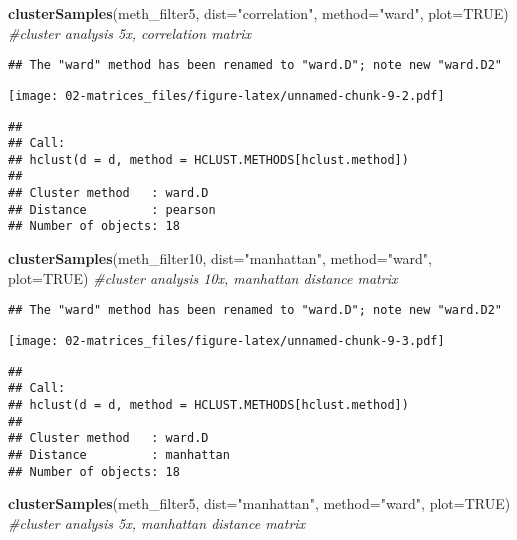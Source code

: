 \documentclass[]{article}
\newenvironment{Shaded}{\begin{snugshade}}{\end{snugshade}}
\newcommand{\KeywordTok}[1]{\textcolor[rgb]{0.13,0.29,0.53}{\textbf{#1}}}
\newcommand{\DataTypeTok}[1]{\textcolor[rgb]{0.13,0.29,0.53}{#1}}
\newcommand{\StringTok}[1]{\textcolor[rgb]{0.31,0.60,0.02}{#1}}
\newcommand{\CommentTok}[1]{\textcolor[rgb]{0.56,0.35,0.01}{\textit{#1}}}
\newcommand{\OtherTok}[1]{\textcolor[rgb]{0.56,0.35,0.01}{#1}}
\newcommand{\NormalTok}[1]{#1}
\begin{document}
\begin{Shaded}
\begin{Highlighting}[]
\KeywordTok{clusterSamples}\NormalTok{(meth_filter5, }\DataTypeTok{dist=}\StringTok{"correlation"}\NormalTok{, }\DataTypeTok{method=}\StringTok{"ward"}\NormalTok{, }\DataTypeTok{plot=}\OtherTok{TRUE}\NormalTok{) }\CommentTok{#cluster analysis 5x, correlation matrix}
\end{Highlighting}
\end{Shaded}

\begin{verbatim}
## The "ward" method has been renamed to "ward.D"; note new "ward.D2"
\end{verbatim}

\texttt{[image: 02-matrices\_files/figure-latex/unnamed-chunk-9-2.pdf]}

\begin{verbatim}
## 
## Call:
## hclust(d = d, method = HCLUST.METHODS[hclust.method])
## 
## Cluster method   : ward.D 
## Distance         : pearson 
## Number of objects: 18
\end{verbatim}

\begin{Shaded}
\begin{Highlighting}[]
\KeywordTok{clusterSamples}\NormalTok{(meth_filter10, }\DataTypeTok{dist=}\StringTok{"manhattan"}\NormalTok{, }\DataTypeTok{method=}\StringTok{"ward"}\NormalTok{, }\DataTypeTok{plot=}\OtherTok{TRUE}\NormalTok{)  }\CommentTok{#cluster analysis 10x, manhattan distance matrix}
\end{Highlighting}
\end{Shaded}

\begin{verbatim}
## The "ward" method has been renamed to "ward.D"; note new "ward.D2"
\end{verbatim}

\texttt{[image: 02-matrices\_files/figure-latex/unnamed-chunk-9-3.pdf]}

\begin{verbatim}
## 
## Call:
## hclust(d = d, method = HCLUST.METHODS[hclust.method])
## 
## Cluster method   : ward.D 
## Distance         : manhattan 
## Number of objects: 18
\end{verbatim}

\begin{Shaded}
\begin{Highlighting}[]
\KeywordTok{clusterSamples}\NormalTok{(meth_filter5, }\DataTypeTok{dist=}\StringTok{"manhattan"}\NormalTok{, }\DataTypeTok{method=}\StringTok{"ward"}\NormalTok{, }\DataTypeTok{plot=}\OtherTok{TRUE}\NormalTok{)  }\CommentTok{#cluster analysis 5x, manhattan distance matrix}
\end{Highlighting}
\end{Shaded}
\end{document}
